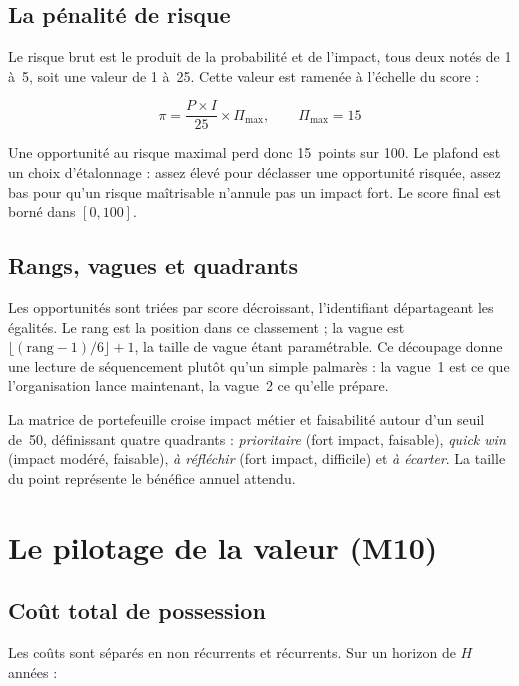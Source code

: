 \subsection{La pénalité de risque}

Le risque brut est le produit de la probabilité et de l'impact, tous deux notés de 1
à~5, soit une valeur de 1 à~25. Cette valeur est ramenée à l'échelle du score :

\begin{equation}
\pi = \frac{P \times I}{25} \times \Pi_{\max},
\qquad \Pi_{\max} = 15
\label{eq:penalite}
\end{equation}

Une opportunité au risque maximal perd donc 15~points sur 100. Le plafond est un choix
d'étalonnage : assez élevé pour déclasser une opportunité risquée, assez bas pour qu'un
risque maîtrisable n'annule pas un impact fort. Le score final est borné dans $[0,100]$.

\subsection{Rangs, vagues et quadrants}

Les opportunités sont triées par score décroissant, l'identifiant départageant les
égalités. Le rang est la position dans ce classement ; la vague est
$\lfloor (\text{rang}-1) / 6 \rfloor + 1$, la taille de vague étant paramétrable. Ce
découpage donne une lecture de séquencement plutôt qu'un simple palmarès : la vague~1
est ce que l'organisation lance maintenant, la vague~2 ce qu'elle prépare.

La matrice de portefeuille croise impact métier et faisabilité autour d'un seuil de~50,
définissant quatre quadrants : \emph{prioritaire} (fort impact, faisable),
\emph{quick win} (impact modéré, faisable), \emph{à réfléchir} (fort impact, difficile)
et \emph{à écarter}. La taille du point représente le bénéfice annuel attendu.

\section{Le pilotage de la valeur (M10)}

\subsection{Coût total de possession}

Les coûts sont séparés en non récurrents et récurrents. Sur un horizon de $H$ années :

